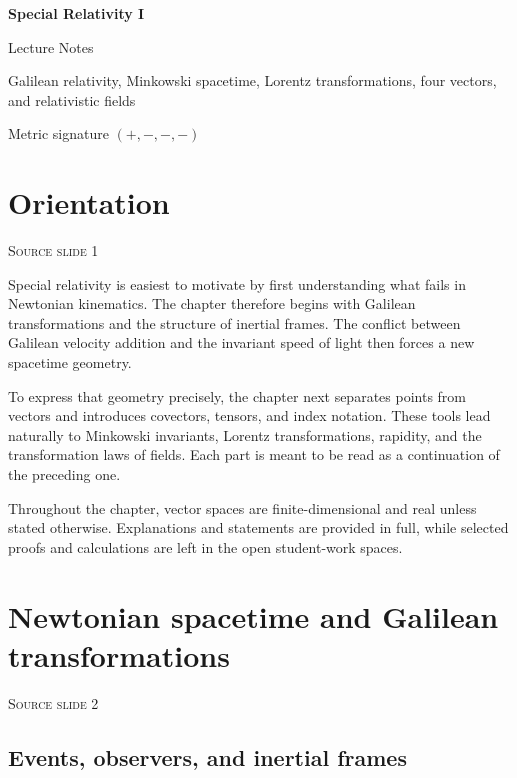 \documentclass[11pt,a4paper]{article}
\newcommand{\slideref}[1]{%
  \par\smallskip
  {\footnotesize\color{ink!60}\textsc{Source slide #1}}\par
}
\begin{document}
\hypersetup{pageanchor=false}

\begin{titlepage}
  \centering
  \vspace*{2.2cm}
  {\Huge\bfseries\color{vuBurgundy}Special Relativity I\par}
  \vspace{0.45cm}
  {\LARGE\color{vuBurgundy}Lecture Notes\par}
  \vspace{0.8cm}
  {\large Galilean relativity, Minkowski spacetime, Lorentz transformations, four vectors, and relativistic fields\par}
  \vfill
  {\small Metric signature \( (+,-,-,-) \)}
\end{titlepage}

\hypersetup{pageanchor=true}
\tableofcontents
\clearpage
{}

\section{Orientation}
\slideref{1}

Special relativity is easiest to motivate by first understanding what fails in
Newtonian kinematics. The chapter therefore begins with Galilean transformations and the
structure of inertial frames. The conflict between Galilean velocity addition
and the invariant speed of light then forces a new spacetime geometry.

To express that geometry precisely, the chapter next separates points from
vectors and introduces covectors, tensors, and index notation. These tools lead
naturally to Minkowski invariants, Lorentz transformations, rapidity, and the
transformation laws of fields. Each part is meant to be read as a continuation
of the preceding one.

Throughout the chapter, vector spaces are finite-dimensional and real unless
stated otherwise. Explanations and statements are provided in full, while
selected proofs and calculations are left in the open student-work spaces.

\section{Newtonian spacetime and Galilean transformations}
\slideref{2}

\subsection{Events, observers, and inertial frames}
\end{document}
